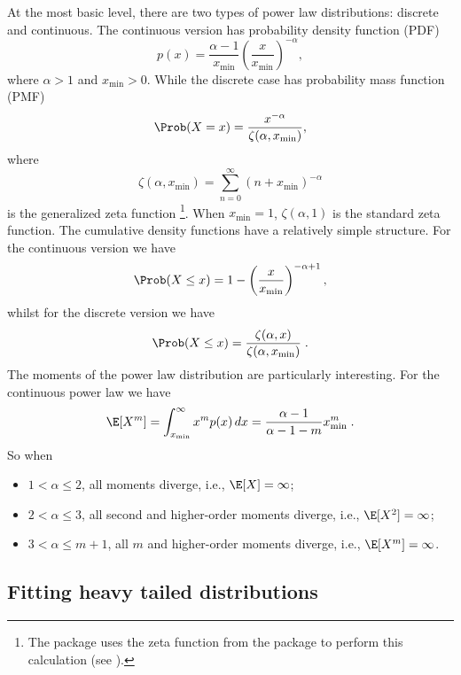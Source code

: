 \documentclass[article]{jss}
\newcommand{\xmin}{x_{\min}}
\begin{document}
At the most basic level, there are two types of power law
distributions: discrete and continuous. The continuous version has
probability density function (PDF)
\begin{equation}
p(x) = \frac{\alpha-1}{\xmin} \left(\frac{x}{\xmin}\right)^{-\alpha},
\end{equation}
where $\alpha >1$ and $\xmin >0$. While the discrete case has probability mass
function (PMF)
\begin{equation}
\Prob(X=x) = \frac{x^{-\alpha}}{\zeta(\alpha, \xmin)},
\end{equation}
where
\begin{equation}
\zeta(\alpha, \xmin) = \sum_{n=0}^{\infty} (n + \xmin)^{-\alpha}
\end{equation}
is the generalized zeta function \citep{Abramowitz1970}\footnote{The
   package uses the zeta function from the  package to
  perform this calculation (see \citealt{Yee2010}).}. When $\xmin=1$,
$\zeta(\alpha, 1)$ is the standard zeta function. The cumulative density
functions have a relatively simple structure. For the continuous version we have
\begin{equation}
\Prob(X\le x) = 1-\left(\frac{x}{\xmin}\right)^{-\alpha + 1},
\end{equation}
whilst for the discrete version we have
\begin{equation}
\Prob(X \le x) = \frac{\zeta(\alpha, x)}{\zeta(\alpha, \xmin)} \;.
\end{equation}
The moments of the power law distribution are particularly interesting. For the
continuous power law we have
\[
\E[X^m] = \int_{\xmin}^{\infty} x^m p(x)\, dx = \frac{\alpha - 1}{\alpha - 1 -m}
\xmin^m \;.
\]
So when 
\begin{itemize}
\item $1< \alpha \le 2$, all moments diverge, i.e., $\E[X] = \infty$;
\item $2 < \alpha \le 3$, all second and higher-order moments diverge,
  i.e., $\E[X^2] = \infty$;
\item $3 < \alpha \le m+1$, all $m$ and higher-order moments diverge,
  i.e., $\E[X^m] = \infty$.
\end{itemize}

\subsection{Fitting heavy tailed distributions}\label{2.2}
\end{document}
